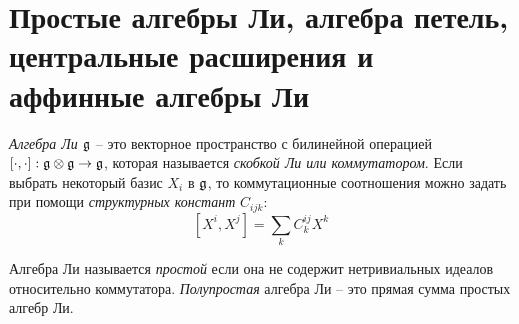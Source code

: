 \section{Простые алгебры Ли, алгебра петель, центральные расширения и аффинные алгебры Ли}

\label{sec:intro-simple-lie-algebras}
\begin{definition}
{\it Алгебра Ли $\mathfrak{g}$} -- это векторное пространство с билинейной операцией $[\cdot,\cdot]:\mathfrak{g}\otimes\mathfrak{g}\to \mathfrak{g}$, которая называется  {\it скобкой Ли или коммутатором}. Если выбрать некоторый базис  $X_{i}$ в $\mathfrak{g}$, то коммутационные соотношения можно задать при помощи  {\it структурных констант} $C_{ijk}$:
\begin{equation}
  \label{eq:1}
  [X^{i},X^{j}]=\sum_{k} C^{ij}_{k} X^{k}
\end{equation}
  
\end{definition}

Алгебра Ли называется {\it простой} если она не содержит нетривиальных идеалов относительно коммутатора. {\it Полупростая} алгебра Ли -- это прямая сумма простых алгебр Ли. 

